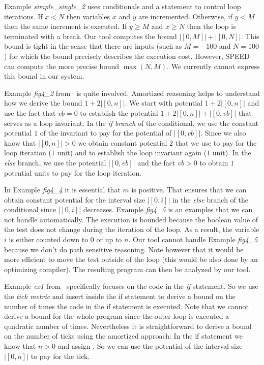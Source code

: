 \documentclass{sigplanconf}
\begin{document}
{Example \emph{simple\_single\_2} uses conditionals and a 
statement to control loop iterations.  If $x<N$ then variables $x$ and
$y$ are incremented.  Otherwise, if $y<M$ then the same increment is
executed.  If $y\geq M$ and $x\geq N$ then the loop is terminated with
a break.  Our tool computes the bound $|[0, M]| + |[0, N]|$.
This bound is tight in the sense that there are inputs (such as $M =
-100$ and $N = 100$) for which the bound precisely describes the
execution cost.  However, SPEED can compute the more precise bound
$\max(N,M)$.  We currently cannot express this bound in our system.

Example \emph{fig4\_2} from~\cite{GulwaniJK09} is quite involved.
Amortized reasoning helps to understand how we derive the bound $1 +
2|[0, n]|$.  We start with potential $1 + 2|[0, n]|$ and use the fact
that $vb=0$ to establish the potential $1 + 2|[0, n]| + |[0,vb]|$ that
serves as a loop invariant.  In the \emph{if branch} of the
conditional, we use the constant potential $1$ of the invariant to pay
for the potential of $|[0,vb]|$.  Since we also know that $|[0, n]|>0$
we obtain constant potential $2$ that we use to pay for the loop
iteration ($1$ unit) and to establish the loop invariant again ($1$
unit).  In the \emph{else} branch, we use the potential $|[0,vb]|$
and the fact $vb>0$ to obtain $1$ potential units to pay for the
loop iteration.

In Example \emph{fig4\_4} it is essential that $m$ is positive.  That
ensures that we can obtain constant potential for the interval size
$|[0,i]|$ in the \emph{else} branch of the conditional since $|[0,i]|$
decreases.  Example \emph{fig4\_5} is an examples that we can not
handle automatically.  The execution is bounded because the boolean
value of the test  does not change during the iteration
of the loop.  As a result, the variable $i$ is either counted down to
$0$ or up to $n$.  Our tool cannot handle Example \emph{fig4\_5}
because we don't do path sensitive reasoning.  Note however that it
would be more efficient to move the test  outside of
the loop (this would be also done by an optimizing compiler).  The
resulting program can then be analyzed by our tool.

Example \emph{ex1} from~\cite{GulwaniZ10} specifically focuses on the
code in the \emph{if} statement.  So we use the \emph{tick metric} and
insert  inside the if statement to derive a bound on
the number of times the code in the if statement is executed.  Note
that we cannot derive a bound for the whole program since the outer
loop is executed a quadratic number of times.  Nevertheless it is
straightforward to derive a bound on the number of ticks using the
amortized approach: In the if statement we know that $n>0$ and assign
.  So we can use the potential of the interval size $|[0,n]|$
to pay for the tick.

}
\end{document}

